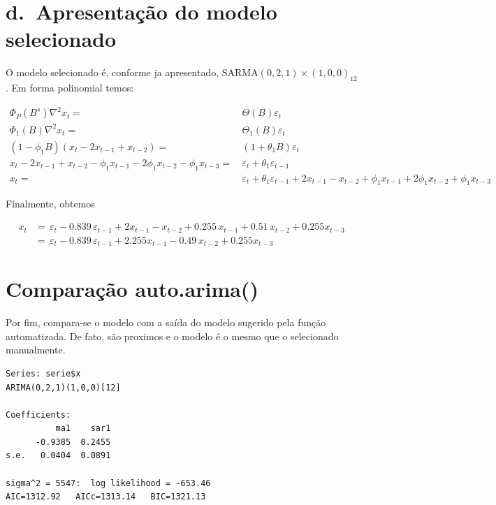 \documentclass[
  letterpaper,
  DIV=11,
  numbers=noendperiod]{scrartcl}
\begin{document}
\hypertarget{d.-apresentauxe7uxe3o-do-modelo-selecionado}{%
\section{d.~Apresentação do modelo
selecionado}\label{d.-apresentauxe7uxe3o-do-modelo-selecionado}}

O modelo selecionado é, conforme ja apresentado,
\(\text{SARMA}(0,2,1)\times(1,0,0)_{12}\). Em forma polinomial temos:

\[
\begin{aligned}
  \Phi_P(B^s)\nabla^2 x_t =& \, \Theta(B)\varepsilon_t \\
  \Phi_1(B) \nabla^2 x_t =& \, \Theta_1(B)\varepsilon_t\\
  (1-\phi_1 B)(x_t - 2x_{t-1} + x_{t-2}) =& \, (1+\theta_1 B)\varepsilon_t \\
  x_t - 2x_{t-1} + x_{t-2} -\phi_1x_{t-1}-2\phi_1x_{t-2} -\phi_1x_{t-3}  =& \, \varepsilon_t  + \theta_1 \varepsilon_{t-1} \\
  x_t  =& \, \varepsilon_t  + \theta_1 \varepsilon_{t-1} + 2x_{t-1} - x_{t-2} +\phi_1x_{t-1}+2\phi_1x_{t-2} +\phi_1x_{t-3}
\end{aligned}
\]

Finalmente, obtemos

\[
\begin{aligned}
x_t  &= \, \varepsilon_t  -0.839 \, \varepsilon_{t-1} + 2x_{t-1} - x_{t-2} +0.255 \, x_{t-1} + 0.51 \, x_{t-2} +0.255 x_{t-3}\\
 &= \, \varepsilon_t  -0.839 \, \varepsilon_{t-1} + 2.255x_{t-1} - 0.49 \, x_{t-2}+0.255 x_{t-3}
 \end{aligned}
\]

\hypertarget{comparauxe7uxe3o-auto.arima}{%
\section{Comparação auto.arima()}\label{comparauxe7uxe3o-auto.arima}}

Por fim, compara-se o modelo com a saída do modelo sugerido pela função
automatizada. De fato, são proximos e o modelo é o mesmo que o
selecionado manualmente.

\begin{verbatim}
Series: serie$x 
ARIMA(0,2,1)(1,0,0)[12] 

Coefficients:
          ma1    sar1
      -0.9385  0.2455
s.e.   0.0404  0.0891

sigma^2 = 5547:  log likelihood = -653.46
AIC=1312.92   AICc=1313.14   BIC=1321.13
\end{verbatim}
\end{document}
